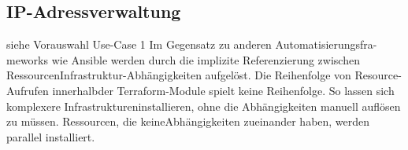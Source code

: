 \subsection{IP-Adressverwaltung}

\ifFalse
siehe Vorauswahl Use-Case 1
 Im  Gegensatz  zu  anderen  Automatisierungsfra-meworks  wie  Ansible  werden  durch  die  implizite  Referenzierung  zwischen  RessourcenInfrastruktur-Abhängigkeiten aufgelöst. Die Reihenfolge von Resource-Aufrufen innerhalbder Terraform-Module spielt keine Reihenfolge. So lassen sich komplexere Infrastruktureninstallieren, ohne die Abhängigkeiten manuell auflösen zu müssen. Ressourcen, die keineAbhängigkeiten zueinander haben, werden parallel installiert.
\fi